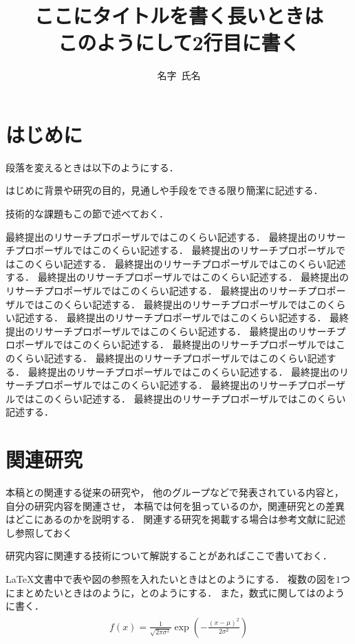 \documentclass[twocolumn,article]{jlreq}
\title{ここにタイトルを書く長いときは\\このようにして2行目に書く}%
\author{名字~氏名}%
\begin{document}

\maketitle%

\section{はじめに}\label{sec:intro}
段落を変えるときは以下のようにする．

はじめに背景や研究の目的，見通しや手段をできる限り簡潔に記述する．

技術的な課題もこの節で述べておく．

最終提出のリサーチプロポーザルではこのくらい記述する．
最終提出のリサーチプロポーザルではこのくらい記述する．
最終提出のリサーチプロポーザルではこのくらい記述する．
最終提出のリサーチプロポーザルではこのくらい記述する．
最終提出のリサーチプロポーザルではこのくらい記述する．
最終提出のリサーチプロポーザルではこのくらい記述する．
最終提出のリサーチプロポーザルではこのくらい記述する．
最終提出のリサーチプロポーザルではこのくらい記述する．
最終提出のリサーチプロポーザルではこのくらい記述する．
最終提出のリサーチプロポーザルではこのくらい記述する．
最終提出のリサーチプロポーザルではこのくらい記述する．
最終提出のリサーチプロポーザルではこのくらい記述する．
最終提出のリサーチプロポーザルではこのくらい記述する．
最終提出のリサーチプロポーザルではこのくらい記述する．
最終提出のリサーチプロポーザルではこのくらい記述する．
最終提出のリサーチプロポーザルではこのくらい記述する．
最終提出のリサーチプロポーザルではこのくらい記述する．


\section{関連研究}\label{sec:relation}
本稿との関連する従来の研究や，
他のグループなどで発表されている内容と，
自分の研究内容を関連させ，
本稿では何を狙っているのか，関連研究との差異はどこにあるのかを説明する．
関連する研究を掲載する場合は参考文献に記述し参照しておく

研究内容に関連する技術について解説することがあればここで書いておく．

\LaTeX 文書中で表や図の参照を入れたいときはとのようにする．
複数の図を$1$つにまとめたいときはのように，とのようにする．
また，数式に関してはのように書く．
\begin{align}
  \label{eq:normal-distribution}
  \begin{aligned}
    f(x)=\frac{1}{\sqrt{2\pi\sigma^{2}}}\exp\left( - \frac{\left( x - \mu \right)^2}{2\sigma^2} \right)
  \end{aligned}
\end{align}
\end{document}
